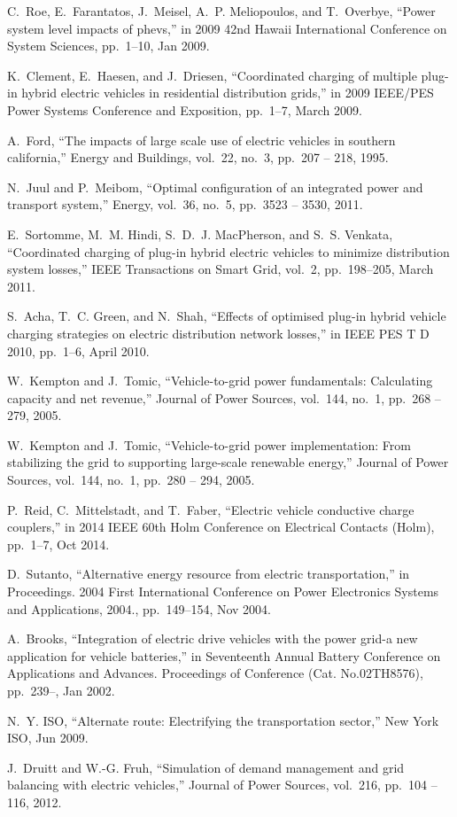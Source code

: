 C.~Roe, E.~Farantatos, J.~Meisel, A.~P. Meliopoulos, and T.~Overbye, ``Power
  system level impacts of phevs,'' in 2009 42nd Hawaii International
  Conference on System Sciences, pp.~1--10, Jan 2009.

K.~Clement, E.~Haesen, and J.~Driesen, ``Coordinated charging of multiple
  plug-in hybrid electric vehicles in residential distribution grids,'' in
  2009 IEEE/PES Power Systems Conference and Exposition, pp.~1--7, March 2009.

A.~Ford, ``The impacts of large scale use of electric vehicles in southern
  california,'' Energy and Buildings, vol.~22, no.~3, pp.~207 -- 218,
  1995.

N.~Juul and P.~Meibom, ``Optimal configuration of an integrated power and
  transport system,'' Energy, vol.~36, no.~5, pp.~3523 -- 3530, 2011.

E.~Sortomme, M.~M. Hindi, S.~D.~J. MacPherson, and S.~S. Venkata, ``Coordinated
  charging of plug-in hybrid electric vehicles to minimize distribution system
  losses,'' IEEE Transactions on Smart Grid, vol.~2, pp.~198--205, March
  2011.

S.~Acha, T.~C. Green, and N.~Shah, ``Effects of optimised plug-in hybrid
  vehicle charging strategies on electric distribution network losses,'' in
  IEEE PES T D 2010, pp.~1--6, April 2010.

W.~Kempton and J.~Tomic, ``Vehicle-to-grid power fundamentals: Calculating
  capacity and net revenue,'' Journal of Power Sources, vol.~144, no.~1,
  pp.~268 -- 279, 2005.

W.~Kempton and J.~Tomic, ``Vehicle-to-grid power implementation: From
  stabilizing the grid to supporting large-scale renewable energy,'' 
  Journal of Power Sources, vol.~144, no.~1, pp.~280 -- 294, 2005.

P.~Reid, C.~Mittelstadt, and T.~Faber, ``Electric vehicle conductive charge
  couplers,'' in 2014 IEEE 60th Holm Conference on Electrical Contacts
  (Holm), pp.~1--7, Oct 2014.

D.~Sutanto, ``Alternative energy resource from electric transportation,'' in
  Proceedings. 2004 First International Conference on Power Electronics
  Systems and Applications, 2004., pp.~149--154, Nov 2004.

A.~Brooks, ``Integration of electric drive vehicles with the power grid-a new
  application for vehicle batteries,'' in Seventeenth Annual Battery
  Conference on Applications and Advances. Proceedings of Conference (Cat.
  No.02TH8576), pp.~239--, Jan 2002.

N.~Y. ISO, ``Alternate route: Electrifying the transportation sector,''
  New York ISO, Jun 2009.

J.~Druitt and W.-G. Fruh, ``Simulation of demand management and grid
  balancing with electric vehicles,'' Journal of Power Sources, vol.~216,
  pp.~104 -- 116, 2012.